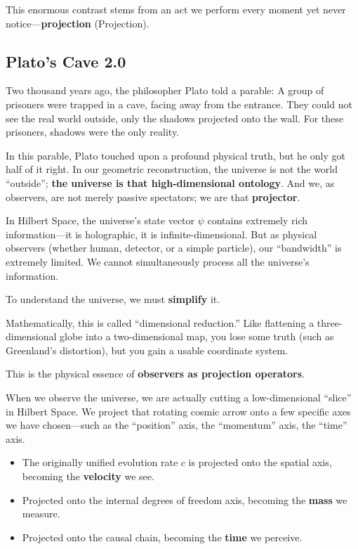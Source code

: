 \documentclass[11pt,a4paper,twoside]{book}
\begin{document}
This enormous contrast stems from an act we perform every moment yet never notice---\textbf{projection} (Projection).

\subsection{Plato's Cave 2.0}

Two thousand years ago, the philosopher Plato told a parable: A group of prisoners were trapped in a cave, facing away from the entrance. They could not see the real world outside, only the shadows projected onto the wall. For these prisoners, shadows were the only reality.

In this parable, Plato touched upon a profound physical truth, but he only got half of it right. In our geometric reconstruction, the universe is not the world ``outside''; \textbf{the universe is that high-dimensional ontology}. And we, as observers, are not merely passive spectators; we are that \textbf{projector}.

In Hilbert Space, the universe's state vector $\psi$ contains extremely rich information---it is holographic, it is infinite-dimensional. But as physical observers (whether human, detector, or a simple particle), our ``bandwidth'' is extremely limited. We cannot simultaneously process all the universe's information.

To understand the universe, we must \textbf{simplify} it.

Mathematically, this is called ``dimensional reduction.'' Like flattening a three-dimensional globe into a two-dimensional map, you lose some truth (such as Greenland's distortion), but you gain a usable coordinate system.

This is the physical essence of \textbf{observers as projection operators}.

When we observe the universe, we are actually cutting a low-dimensional ``slice'' in Hilbert Space. We project that rotating cosmic arrow onto a few specific axes we have chosen---such as the ``position'' axis, the ``momentum'' axis, the ``time'' axis.

\begin{itemize}
\item The originally unified evolution rate $c$ is projected onto the spatial axis, becoming the \textbf{velocity} we see.

\item Projected onto the internal degrees of freedom axis, becoming the \textbf{mass} we measure.

\item Projected onto the causal chain, becoming the \textbf{time} we perceive.
\end{itemize}
\end{document}
